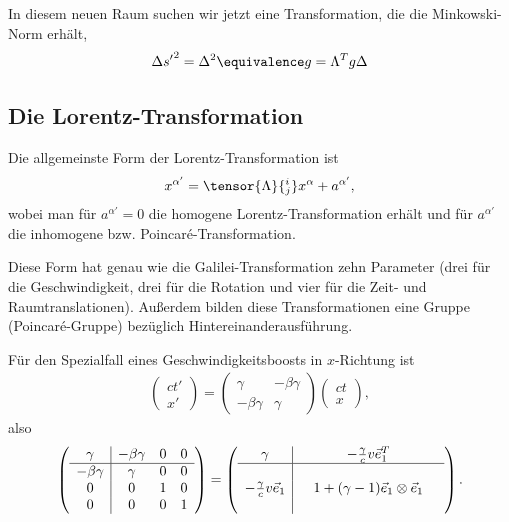 In diesem neuen Raum suchen wir jetzt eine Transformation, die die Minkowski-Norm erhält,
\begin{align*}
    {\Delta s'}^2 = \Delta^2 \equivalence g=\Lambda^T g\Delta
\end{align*}


\subsection{Die Lorentz-Transformation}

Die allgemeinste Form der Lorentz-Transformation ist
\begin{align*}
    x^{\alpha'}=\tensor{\Lambda}{^i_j}x^\alpha+a^{\alpha'},
\end{align*}
wobei man für $a^{\alpha'}=0$ die homogene Lorentz-Transformation erhält und für $a^{\alpha'}$ die inhomogene bzw. Poincaré-Transformation.

Diese Form hat genau wie die Galilei-Transformation zehn Parameter (drei für die Geschwindigkeit, drei für die Rotation und vier für die Zeit- und Raumtranslationen).
Außerdem bilden diese Transformationen eine Gruppe (Poincaré-Gruppe) bezüglich Hintereinanderausführung.

Für den Spezialfall eines Geschwindigkeitsboosts in $x$-Richtung ist
\begin{align*}
    \begin{pmatrix}ct' \\ x' \end{pmatrix} = \begin{pmatrix}\gamma&-\beta\gamma \\ -\beta\gamma &\gamma \end{pmatrix} \begin{pmatrix}ct \\ x \end{pmatrix},
\end{align*}
also
\begin{align*}
    \left(\begin{array}{c|ccc}
              \gamma       & -\beta\gamma & 0 & 0 \\
              \hline
              -\beta\gamma & \gamma       & 0 & 0 \\
              0            & 0            & 1 & 0 \\
              0            & 0            & 0 & 1
          \end{array}\right)
    =\left(\begin{array}{c|ccc}
               \gamma                      &  & -\frac{\gamma}{c}v\vec{e}_1^T           & \\
               \hline
                                           &  &                                         & \\
               -\frac{\gamma}{c}v\vec{e}_1 &  & 1 + (\gamma-1)\vec{e}_1\otimes\vec{e}_1 & \\
                                           &  &                                         &
           \end{array}\right).
\end{align*}

